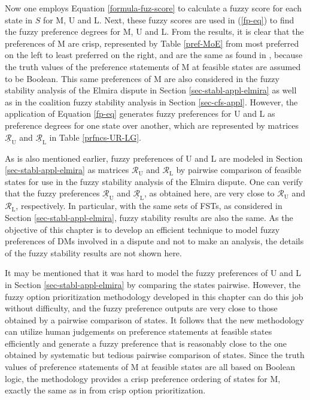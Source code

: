 Now one employs Equation \ref{formula-fuz-score} to calculate a fuzzy score for each state in $S$ for M, U and L. Next, these fuzzy scores are used in (\ref{fp-eq}) to find the fuzzy preference degrees for M, U and L. From the results, it is clear that the preferences of M are crisp, represented by Table \ref{pref-MoE} from most preferred on the left to least preferred on the right, and are the same as found in \citep{Peng1999}, because the truth values of the preference statements of M at feasible states are assumed to be Boolean. This same preferences of M are also considered in the fuzzy stability analysis of the Elmira dispute in Section \ref{sec-stabl-appl-elmira} as well as in the coalition fuzzy stability analysis in Section \ref{sec-cfs-appl}. However, the application of Equation \ref{fp-eq} generates fuzzy preferences for U and L as preference degrees for one state over another, which are represented by matrices $\underline{\mathcal{R}}_\text{U}$ and $\underline{\mathcal{R}}_\text{L}$ in Table \ref{prfncs-UR-LG}.

As is also mentioned earlier, fuzzy preferences of U and L are modeled in Section \ref{sec-stabl-appl-elmira} as matrices $\mathcal{R}_\text{U}$ and $\mathcal{R}_\text{L}$ by pairwise comparison of feasible states for use in the fuzzy stability analysis of the Elmira dispute. One can verify that the fuzzy preferences $\underline{\mathcal{R}}_\text{U}$ and $\underline{\mathcal{R}}_\text{L}$, as obtained here, are very close to $\mathcal{R}_\text{U}$ and $\mathcal{R}_\text{L}$, respectively. In particular, with the same sets of FSTs, as considered in Section \ref{sec-stabl-appl-elmira}, fuzzy stability results are also the same. As the objective of this chapter is to develop an efficient technique to model fuzzy preferences of DMs involved in a dispute and not to make an analysis, the details of the fuzzy stability results are not shown here.

It may be mentioned that it was hard to model the fuzzy preferences of U and L in Section \ref{sec-stabl-appl-elmira} by comparing the states pairwise. However, the fuzzy option prioritization methodology developed in this chapter can do this job without difficulty, and the fuzzy preference outputs are very close to those obtained by a pairwise comparison of states. It follows that the new methodology can utilize human judgements on preference statements at feasible states efficiently and generate a fuzzy preference that is reasonably close to the one obtained by systematic but tedious pairwise comparison of states. Since the truth values of preference statements of M at feasible states are all based on Boolean logic, the methodology provides a crisp preference ordering of states for M, exactly the same as in \cite{Peng1999} from crisp option prioritization.

